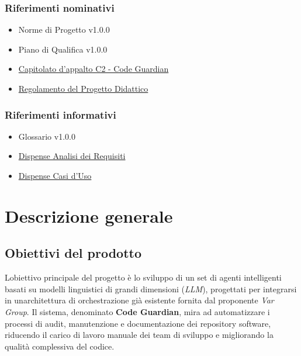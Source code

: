 \documentclass[12pt, a4paper]{article}
\begin{document}
\subsubsection{Riferimenti nominativi}\label{riferimenti-nominativi}

\begin{itemize}
\item
  Norme di Progetto v1.0.0
\item
  Piano di Qualifica v1.0.0
\item
  \href{https://www.math.unipd.it/~tullio/IS-1/2025/Progetto/C2p.pdf}{Capitolato
  d'appalto C2 - Code Guardian}
\item
  \href{https://www.math.unipd.it/~tullio/IS-1/2025/Dispense/PD1.pdf}{Regolamento
  del Progetto Didattico}
\end{itemize}

\subsubsection{Riferimenti informativi}\label{riferimenti-informativi}

\begin{itemize}
\item
  Glossario v1.0.0
\item
  \href{https://www.math.unipd.it/~tullio/IS-1/2025/Dispense/T05.pdf}{Dispense
  Analisi dei Requisiti}
\item
  \href{https://www.math.unipd.it/~rcardin/swea/2022/Diagrammi\%20Use\%20Case.pdf}{Dispense
  Casi d'Uso}
\end{itemize}

\section{Descrizione generale}\label{descrizione-generale}

\subsection{Obiettivi del prodotto}\label{obiettivi-del-prodotto}

L\textquotesingle obiettivo principale del progetto è lo sviluppo di un
set di agenti intelligenti basati su modelli linguistici di grandi
dimensioni (\emph{LLM}), progettati per integrarsi in
un\textquotesingle architettura di orchestrazione già esistente fornita
dal proponente \emph{Var Group}. Il sistema, denominato \textbf{Code
Guardian}, mira ad automatizzare i processi di audit, manutenzione e
documentazione dei repository software, riducendo il carico di lavoro
manuale dei team di sviluppo e migliorando la qualità complessiva del
codice.
\end{document}
